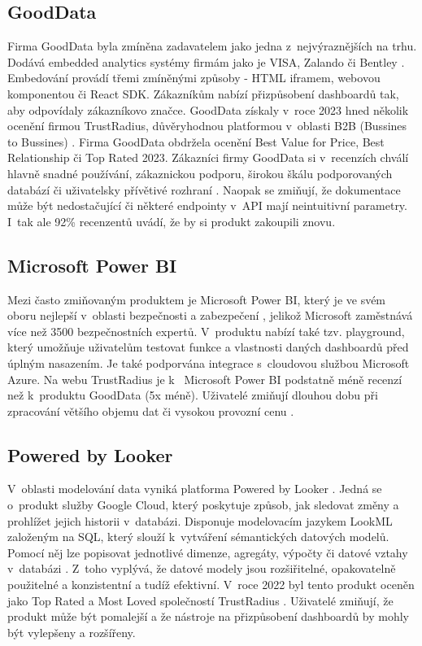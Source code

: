 \documentclass[czech, bc, kiv, he, iso690numb]{fasthesis}
\begin{document}
\subsection{GoodData}
Firma GoodData byla zmíněna zadavatelem jako jedna z~nejvýraznějších na trhu. Dodává embedded analytics systémy firmám jako je VISA, Zalando či Bentley \cite{goodDataEmbeddingPlatform}. 
Embedování provádí třemi zmíněnými způsoby - HTML iframem, webovou komponentou či React SDK. Zákazníkům nabízí přizpůsobení dashboardů tak, aby odpovídaly zákazníkovo značce. GoodData získaly
v~roce 2023 hned několik ocenění firmou TrustRadius, důvěryhodnou platformou v~oblasti B2B (Bussines to Bussines) \cite{trustRadiusDiscusionGoodData}. Firma GoodData obdržela ocenění Best Value for Price,
Best Relationship či Top Rated 2023. Zákazníci firmy GoodData si v~recenzích chválí hlavně snadné používání, zákaznickou podporu, širokou škálu podporovaných databází či uživatelsky přívětivé
rozhraní \cite{trustRadiusDiscusionGoodData}. Naopak se zmiňují, že dokumentace může být nedostačující či některé endpointy v~API mají neintuitivní parametry. I~tak ale 92\% recenzentů uvádí,
že by si produkt zakoupili znovu.

\subsection{Microsoft Power BI}
Mezi často zmiňovaným produktem je Microsoft Power BI, který je ve svém oboru nejlepší v~oblasti bezpečnosti a zabezpečení \cite{bestEmbTools2023},
jelikož Microsoft zaměstnává více než 3500 bezpečnostních expertů. V~produktu nabízí také tzv. playground, který
umožňuje uživatelům testovat funkce a vlastnosti daných dashboardů před úplným nasazením. Je také podporvána integrace s~cloudovou službou Microsoft Azure. Na webu TrustRadius je k~
Microsoft Power BI podstatně méně recenzí než k~produktu GoodData (5x méně). Uživatelé zmiňují dlouhou dobu při zpracování většího objemu dat či vysokou provozní cenu \cite{trustRadiusDiscusionAzure}.

\subsection{Powered by Looker}
V~oblasti modelování data vyniká platforma Powered by Looker \cite{bestEmbTools2023}. Jedná se o~produkt služby Google Cloud, který poskytuje způsob, jak sledovat změny a prohlížet jejich
historii v~databázi. Disponuje modelovacím jazykem LookML založeným na SQL, který slouží k~vytváření sémantických datových modelů. Pomocí něj lze popisovat jednotlivé dimenze, agregáty,
výpočty či datové vztahy v~databázi \cite{googleLookMLDoc}. Z~toho vyplývá, že datové modely jsou rozšiřitelné, opakovatelně použitelné a konzistentní a tudíž efektivní. V~roce 2022 byl tento produkt
oceněn jako Top Rated a Most Loved společností TrustRadius \cite{trustRadiusDiscusionLooker}. Uživatelé zmiňují, že produkt může být pomalejší a že nástroje na přizpůsobení dashboardů by mohly být
vylepšeny a rozšířeny.
\end{document}

